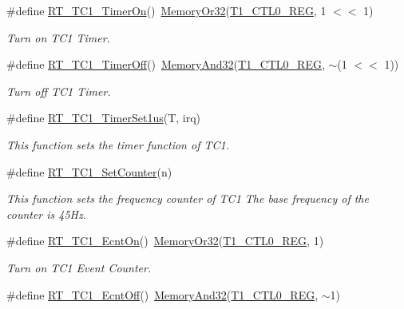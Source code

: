 \begin{DoxyCompactItemize}
\#define \mbox{\hyperlink{a00080_ac76393581e0b1d58a9628139db72cdaf}{R\+T\+\_\+\+T\+C1\+\_\+\+Timer\+On}}()~\mbox{\hyperlink{a00026_a27874a97deab7cecdde5ddecf466e31e}{Memory\+Or32}}(\mbox{\hyperlink{a00026_a55600694c3c73a1019f78d306f474fa1}{T1\+\_\+\+C\+T\+L0\+\_\+\+R\+EG}}, 1 $<$$<$ 1)
\begin{DoxyCompactList}\small\item\em Turn on T\+C1 Timer. \end{DoxyCompactList}\item 
\#define \mbox{\hyperlink{a00080_a1bccbc833364c4f1c6ce63a758136817}{R\+T\+\_\+\+T\+C1\+\_\+\+Timer\+Off}}()~\mbox{\hyperlink{a00026_ad87cedffcaadc51db22594fce55173d4}{Memory\+And32}}(\mbox{\hyperlink{a00026_a55600694c3c73a1019f78d306f474fa1}{T1\+\_\+\+C\+T\+L0\+\_\+\+R\+EG}}, $\sim$(1 $<$$<$ 1))
\begin{DoxyCompactList}\small\item\em Turn off T\+C1 Timer. \end{DoxyCompactList}\item 
\#define \mbox{\hyperlink{a00080_a69c07e4e9fc56ae94d167f79399e7867}{R\+T\+\_\+\+T\+C1\+\_\+\+Timer\+Set1us}}(T,  irq)
\begin{DoxyCompactList}\small\item\em This function sets the timer function of T\+C1. \end{DoxyCompactList}\item 
\#define \mbox{\hyperlink{a00080_ac04f2d9427689062596382399aa7d909}{R\+T\+\_\+\+T\+C1\+\_\+\+Set\+Counter}}(n)
\begin{DoxyCompactList}\small\item\em This function sets the frequency counter of T\+C1 The base frequency of the counter is 45\+Hz. \end{DoxyCompactList}\item 
\#define \mbox{\hyperlink{a00080_add9b6f778a744d79226f5165a04a38d9}{R\+T\+\_\+\+T\+C1\+\_\+\+Ecnt\+On}}()~\mbox{\hyperlink{a00026_a27874a97deab7cecdde5ddecf466e31e}{Memory\+Or32}}(\mbox{\hyperlink{a00026_a55600694c3c73a1019f78d306f474fa1}{T1\+\_\+\+C\+T\+L0\+\_\+\+R\+EG}}, 1)
\begin{DoxyCompactList}\small\item\em Turn on T\+C1 Event Counter. \end{DoxyCompactList}\item 
\#define \mbox{\hyperlink{a00080_a1c9b9839a03d3e9b1158a2be2feebf42}{R\+T\+\_\+\+T\+C1\+\_\+\+Ecnt\+Off}}()~\mbox{\hyperlink{a00026_ad87cedffcaadc51db22594fce55173d4}{Memory\+And32}}(\mbox{\hyperlink{a00026_a55600694c3c73a1019f78d306f474fa1}{T1\+\_\+\+C\+T\+L0\+\_\+\+R\+EG}}, $\sim$1)

\end{DoxyCompactItemize}
